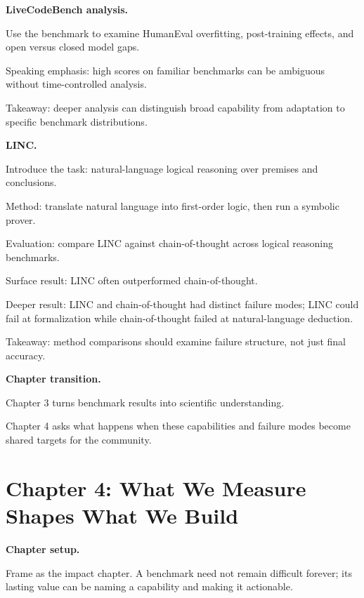 \documentclass[10pt,twocolumn]{article}
\let\olditemize\itemize
\let\oldenditemize\enditemize
\renewenvironment{itemize}{\olditemize
  \setlength{\itemsep}{1pt}
  \setlength{\parskip}{0pt}
  \setlength{\parsep}{0pt}
  \setlength{\topsep}{2pt}
}{\oldenditemize}
\begin{document}
\textbf{LiveCodeBench analysis.}
\begin{itemize}
  \item Use the benchmark to examine HumanEval overfitting, post-training effects, and open versus closed model gaps.
  \item Speaking emphasis: high scores on familiar benchmarks can be ambiguous without time-controlled analysis.
  \item Takeaway: deeper analysis can distinguish broad capability from adaptation to specific benchmark distributions.
\end{itemize}

\textbf{LINC.}
\begin{itemize}
  \item Introduce the task: natural-language logical reasoning over premises and conclusions.
  \item Method: translate natural language into first-order logic, then run a symbolic prover.
  \item Evaluation: compare LINC against chain-of-thought across logical reasoning benchmarks.
  \item Surface result: LINC often outperformed chain-of-thought.
  \item Deeper result: LINC and chain-of-thought had distinct failure modes; LINC could fail at formalization while chain-of-thought failed at natural-language deduction.
  \item Takeaway: method comparisons should examine failure structure, not just final accuracy.
\end{itemize}

\textbf{Chapter transition.}
\begin{itemize}
  \item Chapter 3 turns benchmark results into scientific understanding.
  \item Chapter 4 asks what happens when these capabilities and failure modes become shared targets for the community.
\end{itemize}

\section*{Chapter 4: What We Measure Shapes What We Build}

\textbf{Chapter setup.}
\begin{itemize}
  \item Frame as the impact chapter. A benchmark need not remain difficult forever; its lasting value can be naming a capability and making it actionable.
\end{itemize}
\end{document}
